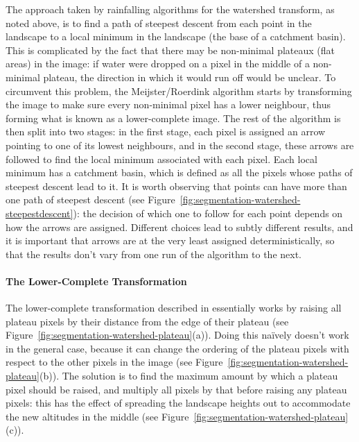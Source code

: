 The approach taken by rainfalling algorithms for the watershed transform, as noted above, is to find a path of steepest descent from each point in the landscape to a local minimum in the landscape (the base of a catchment basin). This is complicated by the fact that there may be non-minimal plateaux (flat areas) in the image: if water were dropped on a pixel in the middle of a non-minimal plateau, the direction in which it would run off would be unclear. To circumvent this problem, the Meijster/Roerdink algorithm starts by transforming the image to make sure every non-minimal pixel has a lower neighbour, thus forming what is known as a lower-complete image. The rest of the algorithm is then split into two stages: in the first stage, each pixel is assigned an arrow pointing to one of its lowest neighbours, and in the second stage, these arrows are followed to find the local minimum associated with each pixel. Each local minimum has a catchment basin, which is defined as all the pixels whose paths of steepest descent lead to it. It is worth observing that points can have more than one path of steepest descent (see Figure~\ref{fig:segmentation-watershed-steepestdescent}): the decision of which one to follow for each point depends on how the arrows are assigned. Different choices lead to subtly different results, and it is important that arrows are at the very least assigned deterministically, so that the results don't vary from one run of the algorithm to the next.


\paragraph{The Lower-Complete Transformation}

The lower-complete transformation described in \cite{meijster98} essentially works by raising all plateau pixels by their distance from the edge of their plateau (see Figure~\ref{fig:segmentation-watershed-plateau}(a)). Doing this na\"ively doesn't work in the general case, because it can change the ordering of the plateau pixels with respect to the other pixels in the image (see Figure~\ref{fig:segmentation-watershed-plateau}(b)). The solution is to find the maximum amount by which a plateau pixel should be raised, and multiply all pixels by that before raising any plateau pixels: this has the effect of spreading the landscape heights out to accommodate the new altitudes in the middle (see Figure~\ref{fig:segmentation-watershed-plateau}(c)).

